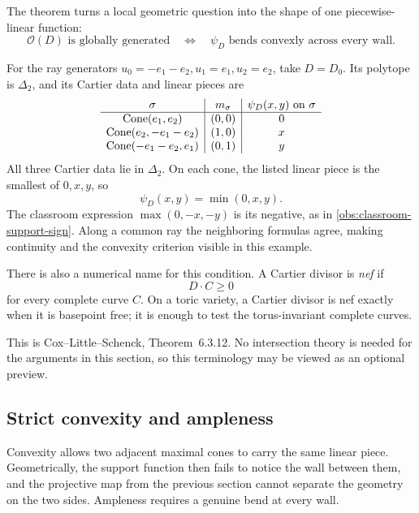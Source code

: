 The theorem turns a local geometric question into the shape of one
piecewise-linear function:
\[
\boxed{
\mathcal O(D)\text{ is globally generated}
\quad\Longleftrightarrow\quad
\psi_D\text{ bends convexly across every wall.}
}
\]

\begin{example}
\label{ex:classroom-p2-support-function}
For the ray generators \(u_0=-e_1-e_2,u_1=e_1,u_2=e_2\), take
\(D=D_0\). Its polytope is \(\Delta_2\), and its Cartier data and
linear pieces are
\[
\begin{array}{c|c|c}
\sigma&m_\sigma&\psi_D(x,y)\text{ on }\sigma\\ \hline
\operatorname{Cone}(e_1,e_2)&(0,0)&0\\
\operatorname{Cone}(e_2,-e_1-e_2)&(1,0)&x\\
\operatorname{Cone}(-e_1-e_2,e_1)&(0,1)&y
\end{array}
\]
All three Cartier data lie in \(\Delta_2\). On each cone, the
listed linear piece is the smallest of \(0,x,y\), so
\[
\psi_D(x,y)=\min(0,x,y).
\]
The classroom expression \(\max(0,-x,-y)\) is its negative, as in
\cref{obs:classroom-support-sign}. Along a common ray the neighboring
formulas agree, making continuity and the convexity criterion
visible in this example.
\end{example}

\begin{observation}
There is also a numerical name for this condition. A Cartier divisor
is \emph{nef} if
\[
D\cdot C\geq0
\]
for every complete curve \(C\). On a toric variety, a Cartier divisor
is nef exactly when it is basepoint free; it is enough to test the
torus-invariant complete curves.

This is Cox--Little--Schenck, Theorem~6.3.12. No intersection theory
is needed for the arguments in this section, so this terminology may
be viewed as an optional preview.
\end{observation}

\subsection{Strict convexity and ampleness}

Convexity allows two adjacent maximal cones to carry the same linear
piece. Geometrically, the support function then fails to notice the
wall between them, and the projective map from the previous section
cannot separate the geometry on the two sides. Ampleness requires a
genuine bend at every wall.

